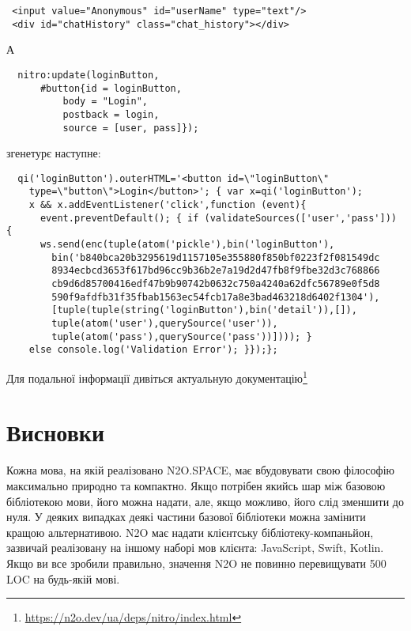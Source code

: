 \begin{lstlisting}
 <input value="Anonymous" id="userName" type="text"/>
 <div id="chatHistory" class="chat_history"></div>
\end{lstlisting}

А

\begin{lstlisting}
  nitro:update(loginButton,
      #button{id = loginButton,
          body = "Login",
          postback = login,
          source = [user, pass]});
\end{lstlisting}

згенетурє наступне:

\begin{lstlisting}
  qi('loginButton').outerHTML='<button id=\"loginButton\"
    type=\"button\">Login</button>'; { var x=qi('loginButton');
    x && x.addEventListener('click',function (event){
      event.preventDefault(); { if (validateSources(['user','pass'])) {
      ws.send(enc(tuple(atom('pickle'),bin('loginButton'),
        bin('b840bca20b3295619d1157105e355880f850bf0223f2f081549dc
        8934ecbcd3653f617bd96cc9b36b2e7a19d2d47fb8f9fbe32d3c768866
        cb9d6d85700416edf47b9b90742b0632c750a4240a62dfc56789e0f5d8
        590f9afdfb31f35fbab1563ec54fcb17a8e3bad463218d6402f1304'),
        [tuple(tuple(string('loginButton'),bin('detail')),[]),
        tuple(atom('user'),querySource('user')),
        tuple(atom('pass'),querySource('pass'))]))); }
    else console.log('Validation Error'); }});};
\end{lstlisting}

Для подальної інформації дивіться актуальную
документацію\footnote{\url{https://n2o.dev/ua/deps/nitro/index.html}}

\section{Висновки}

Кожна мова, на якій реалізовано N2O.SPACE, має вбудовувати
свою філософію максимально природно та компактно. Якщо
потрібен якийсь шар між базовою бібліотекою мови,
його можна надати, але, якщо можливо, його слід
зменшити до нуля. У деяких випадках деякі частини
базової бібліотеки можна замінити кращою альтернативою.
N2O має надати клієнтську бібліотеку-компаньйон,
зазвичай реалізовану на іншому наборі мов клієнта:
JavaScript, Swift, Kotlin. Якщо ви все зробили
правильно, значення N2O не повинно перевищувати
500 LOC на будь-якій мові.
